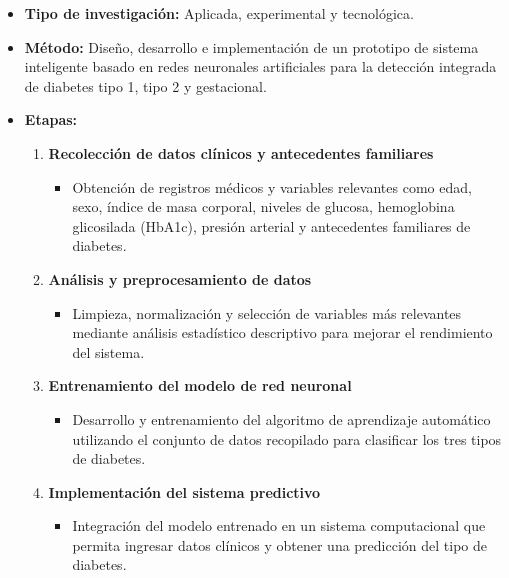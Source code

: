 \begin{itemize}
    \item \textbf{Tipo de investigaci\'on:} Aplicada, experimental y tecnol\'ogica.
    
    \item \textbf{M\'etodo:} Dise\~no, desarrollo e implementaci\'on de un prototipo de sistema inteligente basado en redes neuronales artificiales para la detecci\'on integrada de diabetes tipo 1, tipo 2 y gestacional.
    
    \item \textbf{Etapas:}
    
    \begin{enumerate}
        \item \textbf{Recolecci\'on de datos cl\'inicos y antecedentes familiares}
        \begin{itemize}
            \item Obtenci\'on de registros m\'edicos y variables relevantes como edad, sexo, \'indice de masa corporal, niveles de glucosa, hemoglobina glicosilada (HbA1c), presi\'on arterial y antecedentes familiares de diabetes.
        \end{itemize}
        
        \item \textbf{An\'alisis y preprocesamiento de datos}
        \begin{itemize}
            \item Limpieza, normalizaci\'on y selecci\'on de variables m\'as relevantes mediante an\'alisis estad\'istico descriptivo para mejorar el rendimiento del sistema.
        \end{itemize}
        
        \item \textbf{Entrenamiento del modelo de red neuronal}
        \begin{itemize}
          \item Desarrollo y entrenamiento del algoritmo de aprendizaje autom\'atico utilizando el conjunto de datos recopilado para clasificar los tres tipos de diabetes.
        \end{itemize}
        
        \item \textbf{Implementaci\'on del sistema predictivo}
        \begin{itemize}
            \item Integraci\'on del modelo entrenado en un sistema computacional que permita ingresar datos cl\'inicos y obtener una predicci\'on del tipo de diabetes.
        \end{itemize}
        

\end{enumerate}
\end{itemize}
